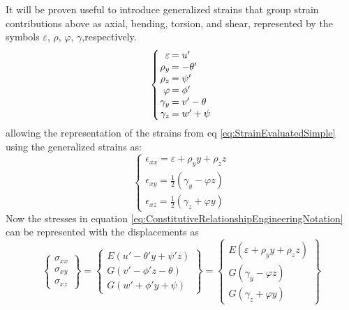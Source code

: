 It will be proven useful to introduce generalized strains that group strain contributions above as axial, bending, torsion, and shear, represented by the symbols $ \varepsilon $, $ \rho $, $ \varphi $, $ \gamma $,respectively.
\begin{equation}\label{eq:GeneralizedStrains}
\left\{\arraycolsep=1pt\begin{array}{rl}
\varepsilon&=u'\\
\rho_{y}&=-\theta'\\
\rho_{z}&=\psi'\\
\varphi&=\phi'\\
\gamma_{y}&=v'-\theta\\
\gamma_{z}&=w'+\psi\end{array}\right.
\end{equation}
allowing the representation of the strains from eq \eqref{eq:StrainEvaluatedSimple} using the generalized strains as:
\begin{equation}\label{eq:StrainEvaluatedSimpleGeneralized}
\left\{\begin{array}{l}
\epsilon_{xx}=\varepsilon+\rho_yy+\rho_zz\\
\epsilon_{xy}=\frac{1}{2}(\gamma_y-\varphi z)\\
\epsilon_{xz}=\frac{1}{2}(\gamma_z+\varphi y)
\end{array}\right.
\end{equation}
Now the stresses in equation \eqref{eq:ConstitutiveRelationshipEngineeringNotation} can be represented with the displacements as 
\begin{equation}\label{key}
\left\{\begin{array}{c}
\sigma_{xx}\\ \sigma_{xy}\\ \sigma_{xz}
\end{array}\right\} = \left\{\begin{array}{c}
E(u'-\theta'y+\psi'z)\\ G(v'-\phi'z-\theta)\\ G(w'+\phi'y+\psi)
\end{array}\right\} = \left\{\begin{array}{c}
E(\varepsilon+\rho_yy+\rho_zz)\\ G(\gamma_y-\varphi z)\\ G(\gamma_z+\varphi y)
\end{array}\right\}
\end{equation}
